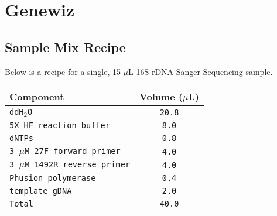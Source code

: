 \documentclass[twocolumn]{article}
\begin{document}
\section{Genewiz}\label{aB}
\subsection{Sample Mix Recipe}
Below is a recipe for a single,
15-$\mu$L 16S rDNA Sanger Sequencing sample.
\begin{table}[h]
  \begin{tabular}{|l|c|}
    \hline
    \textbf{Component} & \textbf{Volume ($\mu$L)} \\
    \hline
    \texttt{ddH$_2$O} & \texttt{20.8} \\
    \hline
    \texttt{5X HF reaction buffer} & \texttt{8.0} \\
    \hline
    \texttt{dNTPs} & \texttt{0.8}\\
    \hline
    \texttt{3 $\mu$M 27F forward primer} & \texttt{4.0} \\
    \hline
    \texttt{3 $\mu$M 1492R reverse primer} & \texttt{4.0} \\
    \hline
    \texttt{Phusion polymerase} & \texttt{0.4} \\
    \hline
    \texttt{template gDNA} & \texttt{2.0} \\
    \hline
    \texttt{Total} & \texttt{40.0} \\
    \hline
  \end{tabular}
  \label{tab:SS_recp}
\end{table}



\end{document}
